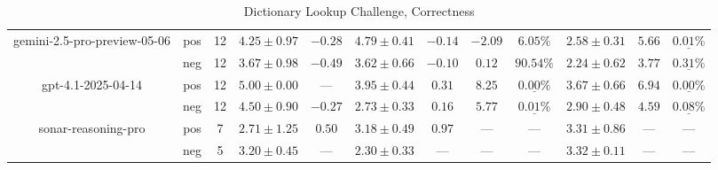 \begin{table}[ht!]
{\begin{tabular}{| c || c | c || c | c || c | c | c | c || c | c | c ||}
      gemini-2.5-pro-preview-05-06
        & pos
        & 12
        & $4.25 \pm 0.97$
        & $-0.28$
        & $4.79 \pm 0.41$
        & $-0.14$
        & $-2.09$
        & $6.05\text{\%}$
        & $2.58 \pm 0.31$
        & $5.66$
        & $\underline{\mathbf{0.01\%}}$ \\
        & neg
        & 12
        & $3.67 \pm 0.98$
        & $-0.49$
        & $3.62 \pm 0.66$
        & $-0.10$
        & $0.12$
        & $90.54\text{\%}$
        & $2.24 \pm 0.62$
        & $3.77$
        & $\underline{\mathbf{0.31\%}}$ \\
    \hline


      gpt-4.1-2025-04-14
        & pos
        & 12
        & $5.00 \pm 0.00$
        & $\text{---}$
        & $3.95 \pm 0.44$
        & $0.31$
        & $8.25$
        & $\underline{\mathbf{0.00\%}}$
        & $3.67 \pm 0.66$
        & $6.94$
        & $\underline{\mathbf{0.00\%}}$ \\
        & neg
        & 12
        & $4.50 \pm 0.90$
        & $-0.27$
        & $2.73 \pm 0.33$
        & $0.16$
        & $5.77$
        & $\underline{\mathbf{0.01\%}}$
        & $2.90 \pm 0.48$
        & $4.59$
        & $\underline{\mathbf{0.08\%}}$ \\
    \hline


      sonar-reasoning-pro
        & pos
        & 7
        & $2.71 \pm 1.25$
        & $0.50$
        & $3.18 \pm 0.49$
        & $0.97$
        & $\text{---}$
        & $\text{---}$
        & $3.31 \pm 0.86$
        & $\text{---}$
        & $\text{---}$ \\
        & neg
        & 5
        & $3.20 \pm 0.45$
        & $\text{---}$
        & $2.30 \pm 0.33$
        & $\text{---}$
        & $\text{---}$
        & $\text{---}$
        & $3.32 \pm 0.11$
        & $\text{---}$
        & $\text{---}$ \\
    \hline


      \hline
    \end{tabular}
  }
  \caption{Dictionary Lookup Challenge, Correctness}
  \label{tbleval-dictionary-correctness_score}
\end{table}


